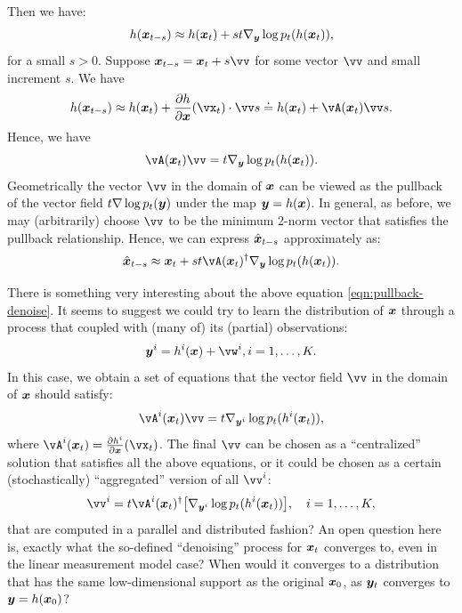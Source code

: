 \documentclass[../../book-main.tex]{subfiles}
\begin{document}
Then we have:
\begin{equation}
    h(\bm{x}_{t-s}) \approx  h(\bm{x}_t) + st \nabla_{\bm{y}} \log p_t(h(\bm{x}_t)),
\end{equation}
for a small $s >0$. 
Suppose $\x_{t-s} = \x_t + s \vv$ for some vector $\vv$ and small increment $s$. We have
\begin{equation}
    h(\x_{t-s}) \approx h(\x_t) + \frac{\partial h}{\partial \x}(\vx_{t}) \cdot \vv s \doteq h(\x_t) + \vA(\x_t) \vv s. 
\end{equation}
Hence, we have
\begin{equation}
    \vA(\x_t) \vv = t \nabla_{\y} \log p_t(h(\x_t)).
    \label{eqn:pushforward}
\end{equation}
Geometrically the vector $\vv$ in the domain of $\bm{x}$ can be viewed as the pullback of the vector field $t \nabla \log p_t(\bm{y})$ under the map $\bm{y} = h(\bm{x})$. In general, as before, we may (arbitrarily) choose $\vv$ to be the minimum 2-norm vector that satisfies the pullback relationship. Hence, we can express  $\hat{\bm{x}}_{t-s}$ approximately as:
\begin{equation}
    \hat{\x}_{t-s} \approx \x_t + st\vA(\x_t)^\dagger \nabla_{\y} \log p_t(h(\x_t)). 
\label{eqn:pullback-denoise}
\end{equation}


\begin{remark}
{There is something very interesting about the above equation \eqref{eqn:pullback-denoise}. It seems to suggest we could try to learn the distribution of $\bm{x}$ through a process that coupled with (many of) its (partial) observations:
\begin{equation}
\y^i = h^i(\x) +\vw^i, i =1, \ldots, K.
\end{equation} In this case, we obtain a set of equations that the vector field $\vv$ in the domain of $\bm{x}$ should satisfy:
\begin{equation}
    \vA^i(\x_t) \vv = t \nabla_{\y^i} \log p_t(h^i(\x_t)),
\label{eqn:federated-pushforward}
\end{equation}
where $\vA^i(\x_t) = \frac{\partial h^i}{\partial \x}(\vx_t)$. The final $\vv$ can be chosen as a ``centralized'' solution that satisfies all the above equations, or it could be chosen as a certain (stochastically) ``aggregated'' version of all $\vv^i$:
\begin{equation}
    \vv^i = t\vA^i(\x_t)^\dagger \big[\nabla_{\y^i} \log p_t(h^i(\x_t))\big], \quad i = 1, \ldots, K,
\end{equation}
that are computed in a parallel and distributed fashion? An open question here is, exactly what the so-defined ``denoising'' process for $\bm{x}_t$ converges to, even in the linear measurement model case? When would it converges to a  distribution that has the same low-dimensional support as the original $\bm{x}_0$, as $\bm{y}_t$ converges to $\bm{y} = h(\bm{x}_0)$? }
\end{remark}
\end{document}
